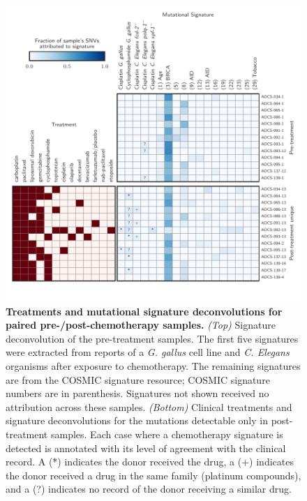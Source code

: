 \begin{figure}[htbp]
\centering
\includegraphics[scale=1.0]{figures/signatures.pdf}
\caption{\textbf{Treatments and mutational signature deconvolutions for paired pre-/post-chemotherapy samples.} \textit{(Top)} Signature deconvolution of the pre-treatment samples. The first five signatures were extracted from reports of a \textit{G. gallus}\cite{Szikriszt_2016} cell line and \textit{C. Elegans}\cite{Meier_2014} organisms after exposure to chemotherapy. The remaining signatures are from the COSMIC signature resource\cite{364242}; COSMIC signature numbers are in parenthesis. Signatures not shown received no attribution across these samples. \textit{(Bottom)} Clinical treatments and signature deconvolutions for the mutations detectable only in post-treatment samples. Each case where a chemotherapy signature is detected is annotated with its level of agreement with the clinical record. A (*) indicates the donor received the drug, a (+) indicates the donor received a drug in the same family (platinum compounds), and a (?) indicates no record of the donor receiving a similar drug.}
\label{fig:signatures}
\end{figure}

